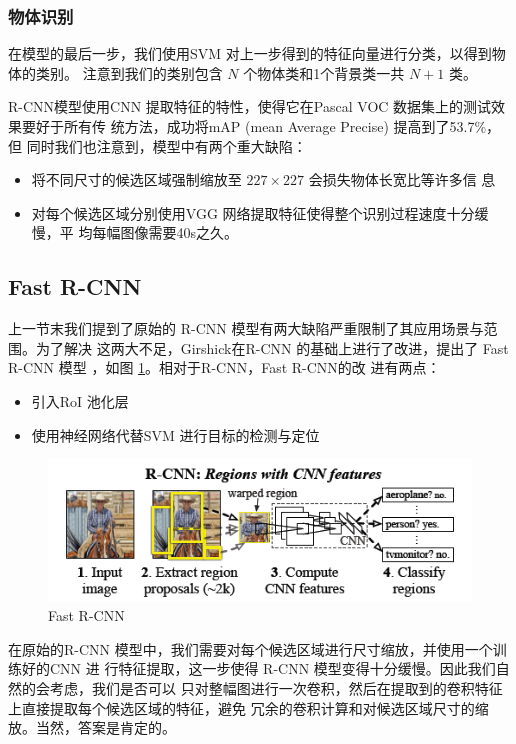 \subsubsection{物体识别}

在模型的最后一步，我们使用SVM 对上一步得到的特征向量进行分类，以得到物体的类别。
注意到我们的类别包含 $N$ 个物体类和1个背景类一共 $N+1$ 类。

R-CNN模型使用CNN 提取特征的特性，使得它在Pascal VOC 数据集上的测试效果要好于所有传
统方法，成功将mAP (mean Average Precise) 提高到了53.7\%\cite{Girshick:2014jx}，但
同时我们也注意到，模型中有两个重大缺陷：

\begin{itemize}
  \item 将不同尺寸的候选区域强制缩放至 $227 \times 227$ 会损失物体长宽比等许多信
    息
  \item 对每个候选区域分别使用VGG 网络提取特征使得整个识别过程速度十分缓慢，平
     均每幅图像需要40s之久\cite{Girshick:2014jx}。
\end{itemize}

\subsection{Fast R-CNN}

上一节末我们提到了原始的 R-CNN 模型有两大缺陷严重限制了其应用场景与范围。为了解决
这两大不足，Girshick在R-CNN 的基础上进行了改进，提出了 Fast R-CNN 模型
\cite{Girshick:2015ib}，如图 \ref{Fig:FastRCNN}。相对于R-CNN，Fast R-CNN的改
进有两点：

\begin{itemize}
  \item 引入RoI 池化层
  \item 使用神经网络代替SVM 进行目标的检测与定位
\end{itemize}

\begin{figure}
  \centering
  \includegraphics[width=0.8\linewidth]{./Figure/FastRCNN.png}
  \caption{Fast R-CNN\cite{Girshick:2015ib}}\label{Fig:FastRCNN}
\end{figure}

在原始的R-CNN 模型中，我们需要对每个候选区域进行尺寸缩放，并使用一个训练好的CNN 进
行特征提取，这一步使得 R-CNN 模型变得十分缓慢。因此我们自然的会考虑，我们是否可以
只对整幅图进行一次卷积，然后在提取到的卷积特征上直接提取每个候选区域的特征，避免
冗余的卷积计算和对候选区域尺寸的缩放。当然，答案是肯定的。

